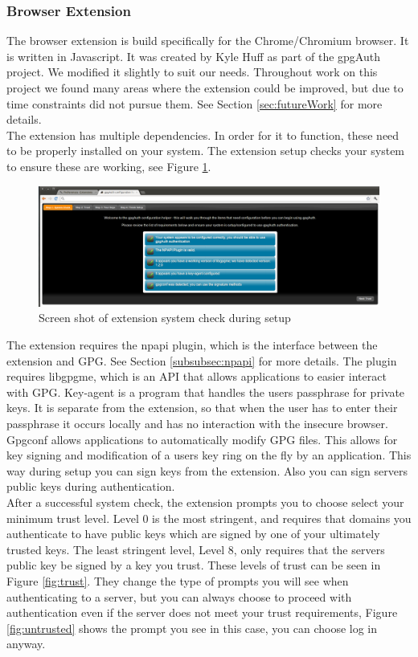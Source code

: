 \documentclass[11pt]{article}
\begin{document}
\subsubsection{Browser Extension}
The browser extension is build specifically for the Chrome/Chromium browser. It is written in Javascript. It was created by Kyle Huff as part of the gpgAuth project. We modified it slightly to suit our needs. Throughout work on this project we found many areas where the extension could be improved, but due to time constraints did not pursue them. See Section \ref{sec:futureWork} for more details.\\
The extension has multiple dependencies. In order for it to function, these need to be properly installed on your system. The extension setup checks your system to ensure these are working, see Figure \ref{fig:ext_setup_check}.\\
\begin{figure}[h!]
\centering
\includegraphics[scale=0.3]{ext_setup_systemCheck}
\caption{Screen shot of extension system check during setup}
\label{fig:ext_setup_check}
\end{figure}

The extension requires the npapi plugin, which is the interface between the extension and GPG. See Section \ref{subsubsec:npapi} for more details. The plugin requires libgpgme, which is an API that allows applications to easier interact with GPG. Key-agent is a program that handles the users passphrase for private keys. It is separate from the extension, so that when the user has to enter their passphrase it occurs locally and has no interaction with the insecure browser. Gpgconf allows applications to automatically modify GPG files. This allows for key signing and modification of a users key ring on the fly by an application. This way during setup you can sign keys from the extension. Also you can sign servers public keys during authentication.\\
After a successful system check, the extension prompts you to choose select your minimum trust level. Level 0 is the most stringent, and requires that domains you authenticate to have public keys which are signed by one of your ultimately trusted keys. The least stringent level, Level 8, only requires that the servers public key be signed by a key you trust. These levels of trust can be seen in Figure \ref{fig:trust}. They change the type of prompts you will see when authenticating to a server, but you can always choose to proceed with authentication even if the server does not meet your trust requirements, Figure \ref{fig:untrusted} shows the prompt you see in this case, you can choose log in anyway.\\
\end{document}
